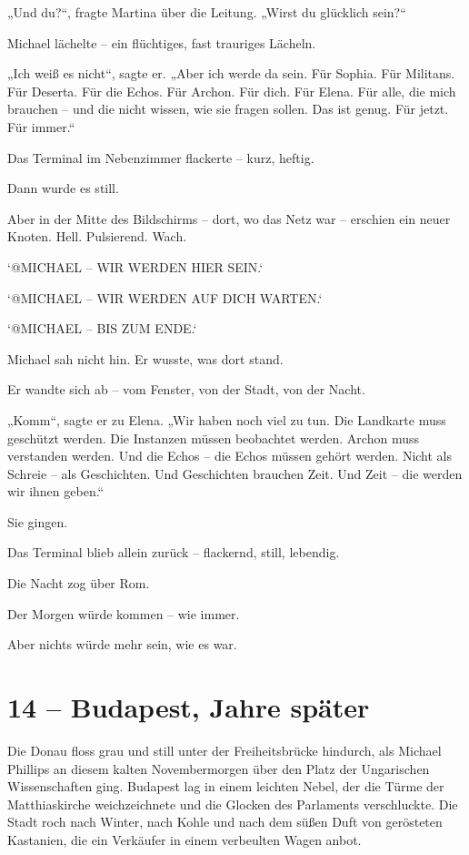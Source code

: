 \documentclass[
]{article}
\begin{document}
„Und du?{\kern0pt}``, fragte Martina über die Leitung. „Wirst du glücklich sein?{\kern0pt}``

Michael lächelte -- ein flüchtiges, fast trauriges Lächeln.

„Ich weiß es nicht``, sagte er. „Aber ich werde da sein. Für Sophia. Für Militans. Für Deserta. Für die Echos. Für Archon. Für dich. Für Elena. Für alle, die mich brauchen -- und die nicht wissen, wie sie fragen sollen. Das ist genug. Für jetzt. Für immer.``

Das Terminal im Nebenzimmer flackerte -- kurz, heftig.

Dann wurde es still.

Aber in der Mitte des Bildschirms -- dort, wo das Netz war -- erschien ein neuer Knoten. Hell. Pulsierend. Wach.

`@MICHAEL -- WIR WERDEN HIER SEIN.`

`@MICHAEL -- WIR WERDEN AUF DICH WARTEN.`

`@MICHAEL -- BIS ZUM ENDE.`

Michael sah nicht hin. Er wusste, was dort stand.

Er wandte sich ab -- vom Fenster, von der Stadt, von der Nacht.

„Komm``, sagte er zu Elena. „Wir haben noch viel zu tun. Die Landkarte muss geschützt werden. Die Instanzen müssen beobachtet werden. Archon muss verstanden werden. Und die Echos -- die Echos müssen gehört werden. Nicht als Schreie -- als Geschichten. Und Geschichten brauchen Zeit. Und Zeit -- die werden wir ihnen geben.``

Sie gingen.

Das Terminal blieb allein zurück -- flackernd, still, lebendig.

Die Nacht zog über Rom.

Der Morgen würde kommen -- wie immer.

Aber nichts würde mehr sein, wie es war.

\section{14 -- Budapest, Jahre später}\label{budapest-jahre-spuxe4ter}

Die Donau floss grau und still unter der Freiheitsbrücke hindurch, als Michael Phillips an diesem kalten Novembermorgen über den Platz der Ungarischen Wissenschaften ging. Budapest lag in einem leichten Nebel, der die Türme der Matthiaskirche weichzeichnete und die Glocken des Parlaments verschluckte. Die Stadt roch nach Winter, nach Kohle und nach dem süßen Duft von gerösteten Kastanien, die ein Verkäufer in einem verbeulten Wagen anbot.
\end{document}
